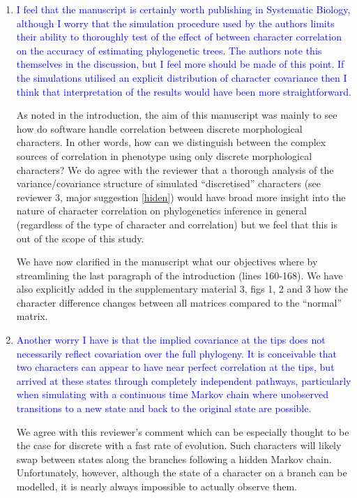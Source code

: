 \documentclass[12pt,letterpaper]{article}
\begin{document}
\begin{enumerate}

\item{\textcolor{blue}{I feel that the manuscript is certainly worth publishing in Systematic Biology, although I worry that the simulation procedure used by the authors limits their ability to thoroughly test of the effect of between character correlation on the accuracy of estimating phylogenetic trees. The authors note this themselves in the discussion, but I feel more should be made of this point. If the simulations utilised an explicit distribution of character covariance then I think that interpretation of the results would have been more straightforward.}}
\label{stramlined}

As noted in the introduction, the aim of this manuscript was mainly to see how do software handle correlation between discrete morphological characters.
In other words, how can we distinguish between the complex sources of correlation in phenotype using only discrete morphological characters?
We do agree with the reviewer that a thorough analysis of the variance/covariance structure of simulated ``discretised'' characters (see reviewer 3, major suggestion \ref{hiden}) would have broad more insight into the nature of character correlation on phylogenetics inference in general (regardless of the type of character and correlation) but we feel that this is out of the scope of this study.

We have now clarified in the manuscript what our objectives where by streamlining the last paragraph of the introduction (lines 160-168).
We have also explicitly added in the supplementary material 3, figs 1, 2 and 3 how the character difference changes between all matrices compared to the ``normal'' matrix.

\item{\textcolor{blue}{Another worry I have is that the implied covariance at the tips does not necessarily reflect covariation over the full phylogeny. It is conceivable that two characters can appear to have near perfect correlation at the tips, but arrived at these states through completely independent pathways, particularly when simulating with a continuous time Markov chain where unobserved transitions to a new state and back to the original state are possible.}}
\label{hiden}

We agree with this reviewer's comment which can be especially thought to be the case for discrete with a fast rate of evolution.
Such characters will likely swap between states along the branches following a hidden Markov chain.
Unfortunately, however, although the state of a character on a branch can be modelled, it is nearly always impossible to actually observe them.


\end{enumerate}
\end{document}
